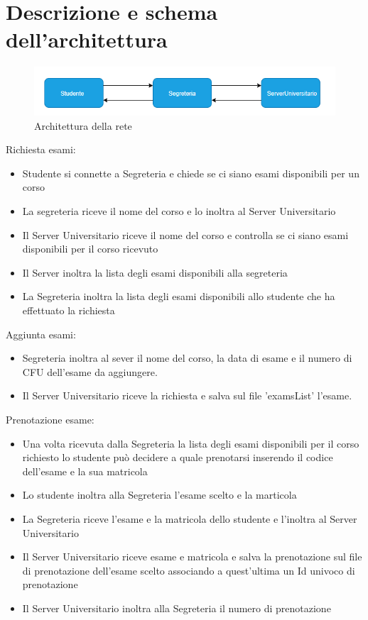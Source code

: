 \documentclass{article}
\begin{document}
\section{Descrizione e schema dell'architettura}
\begin{figure}[htp]
    \centering
    \includegraphics[width=1\linewidth]{architettura-rete.png}
    \caption{Architettura della rete}
\end{figure}

Richiesta esami:
\begin{itemize}
    \item Studente si connette a Segreteria e chiede se ci siano esami disponibili per un corso
    \item La segreteria riceve il nome del corso e lo inoltra al Server Universitario
    \item Il Server Universitario riceve il nome del corso e controlla se ci siano esami disponibili per il corso ricevuto
    \item Il Server inoltra la lista degli esami disponibili alla segreteria
    \item La Segreteria inoltra la lista degli esami disponibili allo studente che ha effettuato la richiesta
\end{itemize}

Aggiunta esami:
\begin{itemize}
    \item Segreteria inoltra al sever il nome del corso, la data di esame e il numero di CFU dell'esame da aggiungere.
    \item Il Server Universitario riceve la richiesta e salva sul file 'examsList' l'esame.
\end{itemize}

Prenotazione esame:
\begin{itemize}
    \item Una volta ricevuta dalla Segreteria la lista degli esami disponibili per il corso richiesto lo studente può decidere a quale prenotarsi inserendo il codice dell'esame e la sua matricola
    \item Lo studente inoltra alla Segreteria l'esame scelto e la marticola
    \item La Segreteria riceve l'esame e la matricola dello studente e l'inoltra al Server Universitario
    \item Il Server Universitario riceve esame e matricola e salva la prenotazione sul file di prenotazione dell'esame scelto associando a quest'ultima un Id univoco di prenotazione
    \item Il Server Universitario inoltra alla Segreteria il numero di prenotazione

\end{itemize}
\end{document}
